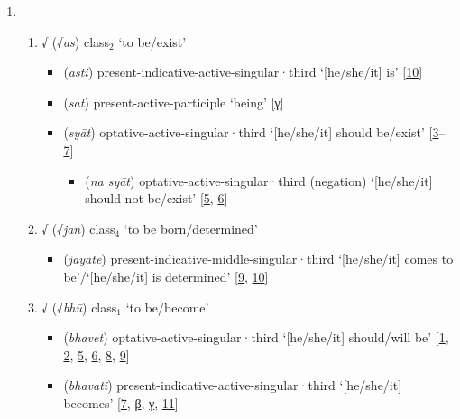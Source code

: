 \begin{enumerate}
\item   \begin{enumerate}
        \item √ (√\textit{as}) \acrshort{class}$_\text{2}$  `to be/exist'
        \begin{itemize}
            \item {} (\textit{asti}) \acrshort{present}-\acrshort{indicative}-\acrshort{active}-\acrshort{singular}·\acrshort{third} `[he/she/it] is' [\hyperlink{Spass10}{10}]
            \item {} (\textit{sat}) \acrshort{present}-\acrshort{active}-\acrshort{participle} `being' [\hyperlink{SpassC}{γ}]        
            \item {} (\textit{syāt}) \acrshort{optative}-\acrshort{active}-\acrshort{singular}·\acrshort{third} `[he/she/it] should be/exist' [\hyperlink{Spass3}{3}--\hyperlink{Spass7}{7}]
                \begin{itemize}
                \item {} (\textit{na syāt}) \acrshort{optative}-\acrshort{active}-\acrshort{singular}·\acrshort{third} (\acrshort{negation}) `[he/she/it] should not be/exist' [\hyperlink{Spass5}{5}, \hyperlink{Spass6}{6}]
                \end{itemize}
        \end{itemize}
        \item √ (√\textit{jan}) \acrshort{class}$_\text{4}$  `to be born/determined'
        \begin{itemize}
            \item {} (\textit{jāyate}) \acrshort{present}-\acrshort{indicative}-\acrshort{middle}-\acrshort{singular}·\acrshort{third} `[he/she/it] comes to be'/`[he/she/it] is determined' [\hyperlink{Spass9}{9}, \hyperlink{Spass10}{10}]
       \end{itemize}
       \item √ (√\textit{bhū}) \acrshort{class}$_\text{1}$  `to be/become'
        \begin{itemize}
            \item {} (\textit{bhavet}) \acrshort{optative}-\acrshort{active}-\acrshort{singular}·\acrshort{third} `[he/she/it] should/will be' [\hyperlink{Spass1}{1}, \hyperlink{Spass2}{2}, \hyperlink{Spass5}{5}, \hyperlink{Spass6}{6}, \hyperlink{Spass8}{8}, \hyperlink{Spass9}{9}]
            \item {} (\textit{bhavati}) \acrshort{present}-\acrshort{indicative}-\acrshort{active}-\acrshort{singular}·\acrshort{third} `[he/she/it] becomes' [\hyperlink{Spass7}{7}, \hyperlink{SpassB}{β}, \hyperlink{SpassC}{γ}, \hyperlink{Spass11}{11}]

\end{itemize}
\end{enumerate}
\end{enumerate}

